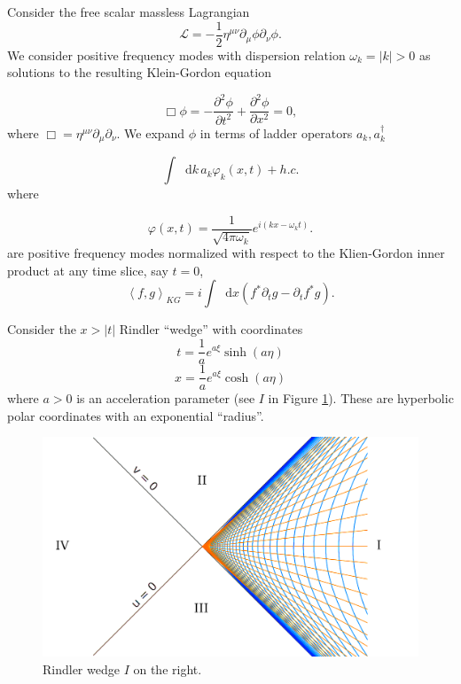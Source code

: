 \documentclass[12pt,a4paper]{article}
\newcommand*\diff{\mathop{}\!\mathrm{d}}
\begin{document}
Consider the free scalar massless Lagrangian
\begin{equation}
\mathscr{L} = -\frac{1}{2} \eta^{\mu\nu}\partial_\mu \phi \partial_\nu \phi.
\end{equation}
We consider positive frequency modes with dispersion relation $\omega_k = |k| > 0$ as solutions to the resulting Klein-Gordon equation 

\begin{equation}
  \Box \phi = -\frac{\partial^2 \phi}{\partial t^2} + \frac{\partial^2 \phi}{\partial x^2} = 0,
 \label{massless-wave-eq}
\end{equation}
where $\Box = \eta^{\mu\nu} \partial_\mu \partial_\nu$. We expand $\phi$ in terms of ladder operators $a_k, a_k^\dagger$

\begin{equation}
  \int \diff k \, a_k \varphi_k(x,t) + h.c.
\end{equation}
where

\begin{equation}
  \varphi(x,t) = \frac{1}{\sqrt{4\pi\omega_k}} e^{i(kx - \omega_k t)}.
\label{amode}
\end{equation}
are positive frequency modes normalized with respect to the Klien-Gordon inner product at any time slice, say $t = 0$,
\begin{equation}
  \left<f, g\right>_{KG} = i \int \diff x (f^* \partial_t g - \partial_t f^* g).
\end{equation}

Consider the $x>|t|$ Rindler ``wedge'' with coordinates
\begin{equation}
  t = \frac{1}{a}e^{a\xi}\sinh{(a\eta)}
\label{sinh}
\end{equation}
\begin{equation}
x = \frac{1}{a}e^{a\xi}\cosh{(a\eta)}
\end{equation}
where $a>0$ is an acceleration parameter (see $I$ in Figure \ref{rindlerw}). These are hyperbolic polar coordinates with an exponential ``radius''.

\begin{figure}[h]
\centering
\includegraphics[scale=0.4]{rindler_w.png}
\caption{Rindler wedge $I$ on the right.}
\label{rindlerw}
\end{figure}
\end{document}
